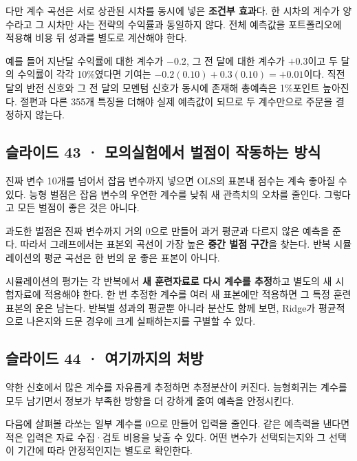 \documentclass[11pt,a4paper]{article}
\begin{document}
다만 계수 곡선은 서로 상관된 시차를 동시에 넣은 \textbf{조건부 효과}다. 한 시차의 계수가 양수라고 그 시차만 사는 전략의 수익률과 동일하지 않다. 전체 예측값을 포트폴리오에 적용해 비용 뒤 성과를 별도로 계산해야 한다.\par

예를 들어 지난달 수익률에 대한 계수가 $-0.2$, 그 전 달에 대한 계수가 $+0.3$이고 두 달의 수익률이 각각 10\%였다면 기여는 $-0.2(0.10)+0.3(0.10)=+0.01$이다. 직전 달의 반전 신호와 그 전 달의 모멘텀 신호가 동시에 존재해 총예측은 1\%포인트 높아진다. 절편과 다른 355개 특징을 더해야 실제 예측값이 되므로 두 계수만으로 주문을 결정하지 않는다.\par

\subsection{슬라이드 43 · 모의실험에서 벌점이 작동하는 방식}
진짜 변수 10개를 넘어서 잡음 변수까지 넣으면 OLS의 표본내 점수는 계속 좋아질 수 있다. 능형 벌점은 잡음 변수의 우연한 계수를 낮춰 새 관측치의 오차를 줄인다. 그렇다고 모든 벌점이 좋은 것은 아니다.\par

과도한 벌점은 진짜 변수까지 거의 0으로 만들어 과거 평균과 다르지 않은 예측을 준다. 따라서 그래프에서는 표본외 곡선이 가장 높은 \textbf{중간 벌점 구간}을 찾는다. 반복 시뮬레이션의 평균 곡선은 한 번의 운 좋은 표본이 아니다.\par

시뮬레이션의 평가는 각 반복에서 \textbf{새 훈련자료로 다시 계수를 추정}하고 별도의 새 시험자료에 적용해야 한다. 한 번 추정한 계수를 여러 새 표본에만 적용하면 그 특정 훈련표본의 운은 남는다. 반복별 성과의 평균뿐 아니라 분산도 함께 보면, Ridge가 평균적으로 나은지와 드문 경우에 크게 실패하는지를 구별할 수 있다.\par

\subsection{슬라이드 44 · 여기까지의 처방}
약한 신호에서 많은 계수를 자유롭게 추정하면 추정분산이 커진다. 능형회귀는 계수를 모두 남기면서 정보가 부족한 방향을 더 강하게 줄여 예측을 안정시킨다.\par

다음에 살펴볼 라쏘는 일부 계수를 0으로 만들어 입력을 줄인다. 같은 예측력을 낸다면 적은 입력은 자료 수집·검토 비용을 낮출 수 있다. 어떤 변수가 선택되는지와 그 선택이 기간에 따라 안정적인지는 별도로 확인한다.\par
\end{document}
